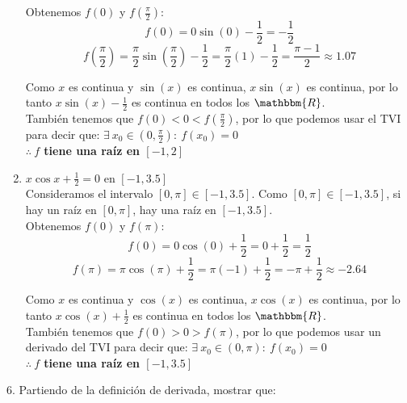\documentclass[12pt]{article}
\begin{document}
\begin{enumerate}[\hspace{9px} a)]
        Obtenemos $f(0)$ y $f(\frac{\pi}{2})$:
        \[f(0)=0\sin(0)-\displaystyle\frac{1}{2}=-\frac{1}{2}\]
        \[f\left(\frac{\pi}{2}\right)=\frac{\pi}{2}\sin\left(\frac{\pi}{2}\right)-\frac{1}{2}=\frac{\pi}{2}(1)-\frac{1}{2}=\frac{\pi-1}{2} \approx 1.07\]

        Como $x$ es continua y $\sin(x)$ es continua, $x\sin(x)$ es continua, por lo tanto $x\sin(x)-\displaystyle\frac{1}{2}$ es continua en todos los $\mathbbm{R}$.\\

        También tenemos que \(f(0)<0<f(\frac{\pi}{2})\), por lo que podemos usar el TVI para decir que: \(\exists \ x_0 \in (0,\frac{\pi}{2}) : \ f(x_0)=0\)\\

        \textbf{ $\therefore \ f$ tiene una raíz en $[-1,2]$}\\
    \item \(x\cos x+\displaystyle\frac{1}{2}=0\) en $[-1,3.5]$\\

        Consideramos el intervalo $[0,\pi] \in [-1,3.5]$. Como $[0,\pi] \in [-1,3.5]$, si hay un raíz en $[0,\pi]$, hay una raíz en $[-1,3.5]$.\\

        Obtenemos $f(0)$ y $f(\pi)$:
        \[f(0)=0\cos(0)+\frac{1}{2}=0+\frac{1}{2}=\frac{1}{2}\]
        \[f(\pi)=\pi\cos(\pi)+\frac{1}{2}=\pi(-1)+\frac{1}{2}=-\pi+\frac{1}{2} \approx -2.64\]

        Como $x$ es continua y $\cos(x)$ es continua, $x\cos(x)$ es continua, por lo tanto $x\cos(x)+\displaystyle\frac{1}{2}$ es continua en todos los $\mathbbm{R}$.\\

        También tenemos que \(f(0)>0>f(\pi)\), por lo que podemos usar un derivado del TVI para decir que: \(\exists \ x_0 \in (0,\pi) : \ f(x_0)=0\)\\

        \textbf{ $\therefore \ f$ tiene una raíz en $[-1,3.5]$}\\
\end{enumerate}

6. Partiendo de la definición de derivada, mostrar que:
\end{document}
